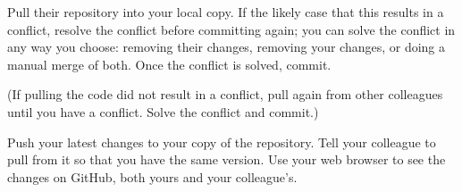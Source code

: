 \documentclass{article}
\begin{document}
Pull their repository into your local copy. If the likely case that
this results in a conflict, resolve the conflict before committing
again; you can solve the conflict in any way you choose: removing
their changes, removing your changes, or doing a manual merge of
both. Once the conflict is solved, commit. 

(If pulling the code did not result in a conflict, pull again from
other colleagues until you have a conflict. Solve the conflict and
commit.) 

Push your latest changes to your copy of the repository. Tell your
colleague to pull from it so that you have the same version. Use your
web browser to see the changes on GitHub, both yours and your
colleague's. 
\end{document}
